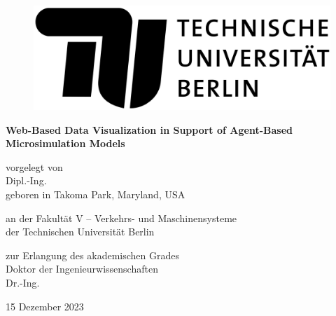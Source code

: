 
\thispagestyle{empty}

\begin{flushright}

	\begin{figure}[!h]
  	\begin{minipage}{1.62\linewidth}
	\begin{center}
	\includegraphics[scale=0.085]{chapters/title/tu-logo-2023.png}
  	\end{center}
  	\end{minipage}
	\end{figure}

	\vspace{20mm}

	\LARGE

	\textbf{\hspace{60mm}Web-Based Data Visualization in Support of Agent-Based\\
	Microsimulation Models} \\[2cm]

	\hrulefill

	\large
	vorgelegt von\\

	Dipl.-Ing. \Autor\\
	geboren in Takoma Park, Maryland, USA\\
	\vspace{10mm}

	an der Fakultät V -- Verkehrs- und Maschinensysteme\\
	der Technischen Universität Berlin

	zur Erlangung des akademischen Grades\\
	Doktor der Ingenieurwissenschaften\\
	Dr.-Ing.\\
	\vspace{5mm}

	15 Dezember 2023\\


\end{flushright}
